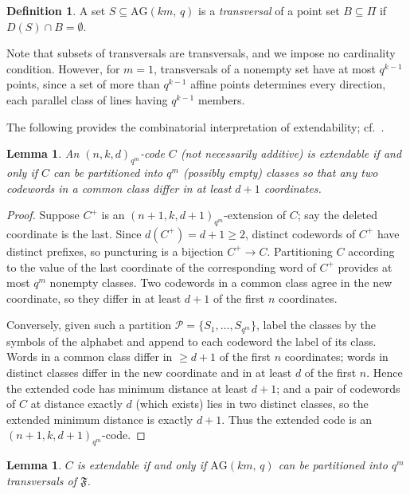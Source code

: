 \documentclass[12pt]{article}
\newtheorem{lem}[thm]{Lemma}
\theoremstyle{definition}
\newtheorem{defn}[thm]{Definition}
\numberwithin{equation}{section}
\newcommand{\PP}{\mathcal{P}}
\newcommand{\AG}[2]{\mathrm{AG}(#1,\,#2)}
\newcommand{\Afold}{\mathfrak{F}}
\begin{document}
\begin{defn}\label{defn:transversal}
A set $S\subseteq\AG{km}{q}$ is a \textit{transversal} of a point set $B\subseteq\Pi$ if $D(S)\cap B=\emptyset$.
\end{defn}

Note that subsets of transversals are transversals, and we impose no cardinality condition. However, for $m=1$, transversals of a nonempty set have at most $q^{k-1}$ points, since a set of more than $q^{k-1}$ affine points determines every direction, each parallel class of lines having $q^{k-1}$ members.  

The following provides the combinatorial interpretation of extendability; cf.\ \cite[Lemma~3.1]{MR2529622}.

\begin{lem}\label{lem:partition}
An $(n,k,d)_{q^m}$-code $C$ (not necessarily additive) is extendable if and only if $C$ can be partitioned into $q^m$ (possibly empty) classes so that any two codewords in a common class differ in at least $d+1$ coordinates.
\end{lem}

\begin{proof}
Suppose $C^+$ is an $(n+1,k,d+1)_{q^m}$-extension of $C$; say the deleted coordinate is the last.  Since $d(C^+)=d+1\ge2$, distinct codewords of $C^+$ have distinct prefixes, so puncturing is a bijection $C^+\to C$. Partitioning $C$ according to the value of the last coordinate of the corresponding word of $C^+$ provides at most $q^m$ nonempty classes. Two codewords in a common class agree in the new coordinate, so they differ in
at least $d+1$ of the first $n$ coordinates.

Conversely, given such a partition $\PP=\{S_1,\ldots,S_{q^m}\}$, label the classes by the symbols of the alphabet and append to each codeword the label of its class.  Words in a common class differ in $\geq d+1$ of the first $n$ coordinates; words in distinct classes differ in the new coordinate and in at least $d$ of the first $n$.  Hence the extended code has minimum distance at least $d+1$; and a pair of codewords of $C$ at
distance exactly $d$ (which exists) lies in two distinct classes, so the extended minimum distance is exactly $d+1$.  Thus the extended code is an $(n+1,k,d+1)_{q^m}$-code.
\end{proof}

\begin{lem}\label{lem:transpartition}
$C$ is extendable if and only if $\AG{km}{q}$ can be partitioned into $q^m$ transversals of $\Afold$.
\end{lem}
\end{document}
